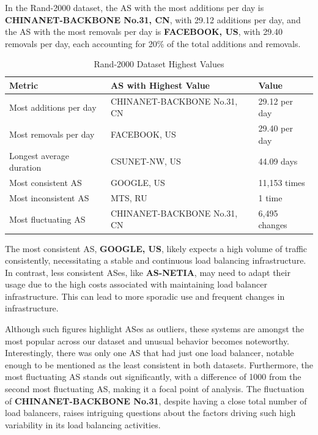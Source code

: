\documentclass[12pt]{cwru_thesis}
\begin{document}
In the Rand-2000 dataset, the AS with the most additions per day is \textbf{CHINANET-BACKBONE No.31, CN}, with 29.12 additions per day, and the AS with the most removals per day is \textbf{FACEBOOK, US}, with 29.40 removals per day, each accounting for 20\% of the total additions and removals.

\begin{table}[h!]
    \centering
    \begin{tabular}{|l|l|l|}
        \hline
        \textbf{Metric} & \textbf{AS with Highest Value} & \textbf{Value} \\
        \hline
        Most additions per day & CHINANET-BACKBONE No.31, CN & 29.12 per day \\
        \hline
        Most removals per day & FACEBOOK, US & 29.40 per day \\
        \hline
        Longest average duration & CSUNET-NW, US & 44.09 days \\
        \hline
        Most consistent AS & GOOGLE, US & 11,153 times \\
        \hline
        Most inconsistent AS & MTS, RU & 1 time \\
        \hline
        Most fluctuating AS & CHINANET-BACKBONE No.31, CN & 6,495 changes \\
        \hline
    \end{tabular}
    \caption{Rand-2000 Dataset Highest Values}
    \label{tab:rand-2000-highest}
\end{table}

The most consistent AS, \textbf{GOOGLE, US}, likely expects a high volume of traffic consistently, necessitating a stable and continuous load balancing infrastructure. In contrast, less consistent ASes, like \textbf{AS-NETIA}, may need to adapt their usage due to the high costs associated with maintaining load balancer infrastructure. This can lead to more sporadic use and frequent changes in infrastructure.

Although such figures highlight ASes as outliers, these systems are amongst the most popular across our dataset and unusual behavior becomes noteworthy. Interestingly, there was only one AS that had just one load balancer, notable enough to be mentioned as the least consistent in both datasets. Furthermore, the most fluctuating AS stands out significantly, with a difference of 1000 from the second most fluctuating AS, making it a focal point of analysis. The fluctuation of \textbf{CHINANET-BACKBONE No.31}, despite having a close total number of load balancers, raises intriguing questions about the factors driving such high variability in its load balancing activities.
\end{document}
